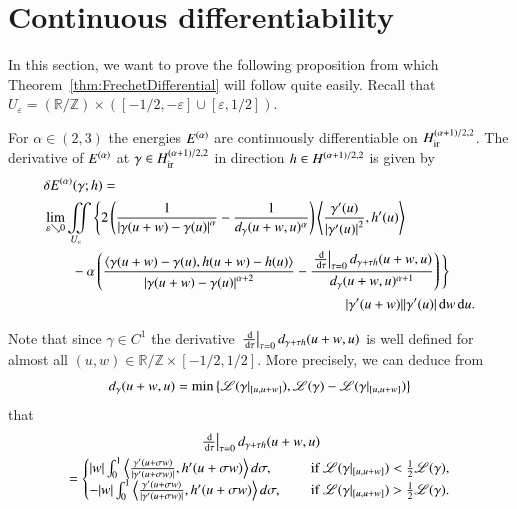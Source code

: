 \section{Continuous differentiability}\label{sect:differentiability}

In this section, we want to prove the following proposition from which Theorem~\ref{thm:FrechetDifferential}
will follow quite easily. Recall that
$U_\varepsilon = (\mathbb R / \mathbb Z )\times ([-1/2, - \varepsilon] \cup [\varepsilon, 1/2])$.
\newcommand{\gt} {\gamma + \tau h}

\begin{proposition}\label{prop:formula}
  For $\alpha \in (2,3)$ the energies $E^{(\alpha)}$ are continuously differentiable
  on $H_{\mathrm{ir}}^{(\alpha+1)/2,2}$. The derivative of $E^{(\alpha)}$ at $\gamma \in H_{\mathrm{ir}}^{(\alpha+1)/2,2}$ in direction $h \in H^{\scriptstyle (\alpha+1)/2,2}$
  is given by
  \begin{equation}\label{eq:formulaD}
  \begin{split}
    &\delta\E(\g;h)  = \\
    &\lim_{\varepsilon \searrow 0} \iint\limits_{U_\eps} \Bigg\{
    2\left(
      \frac 1 {\abs{\D\g}^\a}-\frac 1 {d_\g(u+w,u)^\a} \right)
      \left\langle \frac{\dg(u)}{\abs{\dg(u)}^2},\dh(u) \right\rangle 
\\
    &\qquad -\a %
      \left( \frac{\sp{\D\g,\D h}}{\abs{\D\g}^{\a+2}}
	-\frac{ \left.\tfrac{\d}{\d\tau}\right|_{\tau=0}d_{\gt}(u+w,u)}
		{d_\g(u+w,u)^{\a+1}} \right)\Bigg\} 
\\ &\hspace{7.6cm} |\dg(u+w)| |\dg(u)|\d w\d u .
  \end{split}
  \end{equation}
\end{proposition}

Note that since $\gamma \in C^1$ the derivative 
$\left.\tfrac{\d}{\d\tau}\right|_{\tau=0}d_{\gt}(u+w,u)$ is well defined for almost all
$(u,w) \in \mathbb R / \mathbb Z \times [-1/2, 1/2]$. 
More precisely, we can deduce from
\begin{equation*}
 d_\gamma(u+w,u)= \min\left\{ \mathscr L(\gamma|_{[u,u+w]}),  \mathscr L (\gamma) - \mathscr L(\gamma|_{[u,u+w]})\right\}
\end{equation*}
that 
\begin{multline}\label{eq:dd} 
 \left.\tfrac{\d}{\d\tau}\right|_{\tau=0} d_{\gt} (u+w,u) \\=
 \begin{cases} |w|\int_{0}^1 
    \left\langle \frac {\gamma'(u+\sigma w)}{|\gamma'(u+\sigma w)|} , h'(u+\sigma w) \right\rangle d\sigma,
    &\quad\text{ if } \length(\gamma|_{[u,u+w]}) <\frac 1 2 \length(\gamma),\\
    -|w|\int_{0}^1
    \left\langle  \frac {\gamma'(u+\sigma w)}{|\gamma'(u+\sigma w)|} , h'(u+\sigma w) \right\rangle d\sigma,
    &\quad\text{ if } \length(\gamma|_{[u,u+w]}) > \frac 1 2 \length(\gamma).
    \end{cases}
\end{multline}

